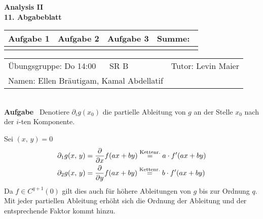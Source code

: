 \documentclass[a4paper, 12pt]{scrartcl}
\newcounter{taski}
\newcommand{\task}{\stepcounter{taski}\textbf{Aufgabe \arabic{taski}}~}
\begin{document}
\begin{center}
    \textbf{Analysis II\\11. Abgabeblatt}\\[2em]
	\def\arraystretch{2}
    \begin{tabular}{|l|l|l||p{18mm}|}
        \hline
         Aufgabe 1 & Aufgabe 2 & Aufgabe 3 & Summe:~ \\
         \hline &&&\\
         \hline  
    \end{tabular}
\end{center}
\begingroup
\def\arraystretch{1.5}
\begin{tabular}{p{}p{}}
	\hline
    Übungsgruppe: Do 14:00 ~~ SR B& Tutor: Levin Maier \\
    Namen: Ellen Bräutigam, Kamal Abdellatif &\\
    \hline
\end{tabular}
\endgroup\\

\setcounter{taski}{2}
\task Denotiere $\partial_ig(x_0)$ die partielle Ableitung von $g$ an der Stelle $x_0$ nach der $i$-ten Komponente.

Sei $(x,\,y) = 0$
\begin{align*}
    \partial_1g(x,\,y) &= \pdv{x}f(ax+by) \overset{\text{Kettenr.}}= a\cdot f'(ax+by) \\
    \partial_2g(x,\,y) &= \pdv{y}f(ax+by) \overset{\text{Kettenr.}}= b\cdot f'(ax+by)
\end{align*}
Da $f \in C^{q+1}(0)$ gilt dies auch für höhere Ableitungen von $g$ bis zur Ordnung $q$. Mit jeder partiellen Ableitung erhöht sich die Ordnung der Ableitung und der entsprechende Faktor kommt hinzu.
\end{document}
